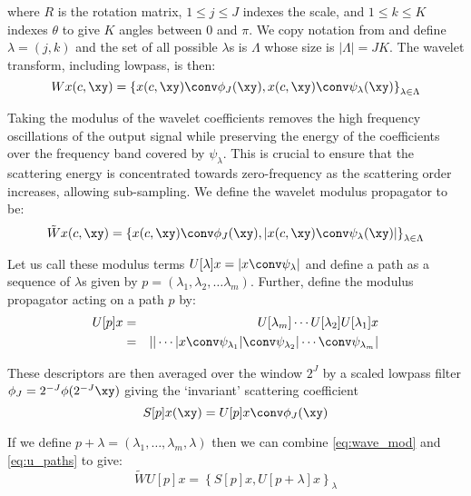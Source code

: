 where $R$ is the rotation matrix, $1 \leq j \leq J$ indexes the scale, and
$1 \leq k \leq K$ indexes $\theta$ to give $K$ angles between $0$ and $\pi$. We
copy notation from \cite{bruna_invariant_2013} and define $\lambda = (j, k)$ and
the set of all possible $\lambda$s is $\Lambda$ whose size is $|\Lambda | = JK$.
The wavelet transform, including lowpass, is then:
%
\begin{equation}
  Wx(c, \xy) = \left\{ x(c, \xy)\conv \phi_J(\xy), x(c, \xy)\conv \psi_\lambda (\xy) \right\}_{\lambda \in \Lambda}
\end{equation}

Taking the modulus of the wavelet coefficients removes the high frequency
oscillations of the output signal while preserving the energy of the
coefficients over the frequency band covered by $\psi_\lambda$. This is crucial
to ensure that the scattering energy is concentrated towards zero-frequency as
the scattering order increases, allowing sub-sampling.
We define the wavelet modulus propagator to be:
%
\begin{equation}
  \label{eq:wave_mod}
  \tilde{W}x(c, \xy) = \left\{ x(c, \xy) \conv \phi_{J}(\xy), |x(c, \xy) \conv \psi_\lambda (\xy) | \right\}_{\lambda \in \Lambda} 
\end{equation}

Let us call these modulus terms $U[\lambda] x = \lvert x \conv \psi_\lambda
\rvert$ and define a path as a sequence of $\lambda$s given by $p = \left(\lambda_1,
\lambda_2, \ldots \lambda_m \right)$. Further, define the modulus propagator
acting on a path $p$ by:
%
\begin{eqnarray}
  U[p]x & = & U[\lambda_m] \cdots U[\lambda_2]U[\lambda_1]x \label{eq:u_paths}\\
        & = & || \cdots | x\conv \psi_{\lambda_1} | \conv \psi_{\lambda_2} | \cdots \conv \psi_{\lambda_m} |
\end{eqnarray}

These descriptors are then averaged over the window $2^J$ by a scaled lowpass filter $\phi_J =
2^{-J}\phi(2^{-J}\xy)$ giving the `invariant' scattering coefficient
%
\begin{equation}
  S[p]x(\xy) = U[p]x \conv \phi_J(\xy)
\end{equation}

If we define $p + \lambda = (\lambda_1, \ldots, \lambda_m, \lambda)$ then we can
combine \autoref{eq:wave_mod} and \autoref{eq:u_paths} to give:
%
\begin{equation}
  \tilde{W} U[p] x = \left\{S[p]x, U[p+\lambda]x \right\}_{\lambda}
\end{equation}

